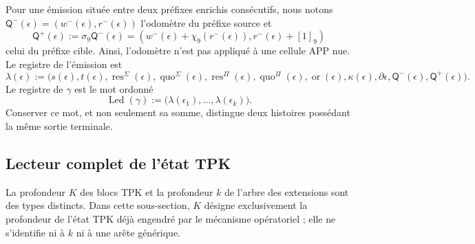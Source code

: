 \begin{definition}
\label{def:continuo-comun-ledger-elemental}
Pour une émission située entre deux préfixes enrichis consécutifs, nous notons \(\mathsf Q^-(\epsilon)=(w^-(\epsilon),r^-(\epsilon))\) l'odomètre du préfixe source et
\begin{equation}
\label{eq:continuo-comun-ledger-fase-extremos}
 \mathsf Q^+(\epsilon):=\sigma_9\mathsf Q^-(\epsilon)
 =(w^-(\epsilon)+\chi_9(r^-(\epsilon)),r^-(\epsilon)+[1]_9)
\end{equation}
celui du préfixe cible. Ainsi, l'odomètre n'est pas appliqué à une cellule APP nue. Le registre de l'émission est
\begin{equation}
\label{eq:continuo-comun-ledger-elemental}
 \lambda(\epsilon):=\bigl(
 s(\epsilon),t(\epsilon),
 \operatorname{res}^{\Sigma}(\epsilon),
 \operatorname{quo}^{\Sigma}(\epsilon),
 \operatorname{res}^{\Pi}(\epsilon),
 \operatorname{quo}^{\Pi}(\epsilon),
 \operatorname{or}(\epsilon),
 \kappa(\epsilon),
 \partial\epsilon,
 \mathsf Q^-(\epsilon),\mathsf Q^+(\epsilon)\bigr).
\end{equation}
Le registre de \(\gamma\) est le mot ordonné
\begin{equation}
\label{eq:continuo-comun-ledger-ruta}
 \operatorname{Led}(\gamma)
 :=\bigl(\lambda(\epsilon_1),\ldots,
          \lambda(\epsilon_k)\bigr).
\end{equation}
Conserver ce mot, et non seulement sa somme, distingue deux histoires possédant la même sortie terminale.
\end{definition}

\subsection{Lecteur complet de l'état TPK}
\label{sec:continuo-comun-lector-estado-tpk}

La profondeur \(K\) des blocs TPK et la profondeur \(k\) de l'arbre des extensions sont des types distincts. Dans cette sous-section, \(K\) désigne exclusivement la profondeur de l'état TPK déjà engendré par le mécanisme opératoriel ; elle ne s'identifie ni à \(k\) ni à une arête générique.

